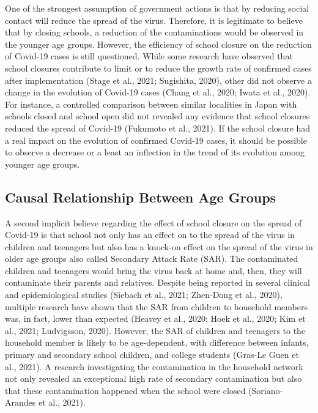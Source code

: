\documentclass[]{elsarticle} %
\begin{document}
One of the strongest assumption of government actions is that by
reducing social contact will reduce the spread of the virus. Therefore,
it is legitimate to believe that by closing schools, a reduction of the
contaminations would be observed in the younger age groups. However, the
efficiency of school closure on the reduction of Covid-19 cases is still
questioned. While some research have observed that school closures
contribute to limit or to reduce the growth rate of confirmed cases
after implementation (Stage et al., 2021; Sugishita, 2020), other did
not observe a change in the evolution of Covid-19 cases (Chang et al.,
2020; Iwata et al., 2020). For instance, a controlled comparison between
similar localities in Japan with schools closed and school open did not
revealed any evidence that school closures reduced the spread of
Covid-19 (Fukumoto et al., 2021). If the school closure had a real
impact on the evolution of confirmed Covid-19 cases, it should be
possible to observe a decrease or a least an inflection in the trend of
its evolution among younger age groups.

\hypertarget{causal-relationship-between-age-groups}{%
\subsection{Causal Relationship Between Age
Groups}\label{causal-relationship-between-age-groups}}

A second implicit believe regarding the effect of school closure on the
spread of Covid-19 is that school not only has an effect on to the
spread of the virus in children and teenagers but also has a knock-on
effect on the spread of the virus in older age groups also called
Secondary Attack Rate (SAR). The contaminated children and teenagers
would bring the virus back at home and, then, they will contaminate
their parents and relatives. Despite being reported in several clinical
and epidemiological studies (Siebach et al., 2021; Zhen-Dong et al.,
2020), multiple research have shown that the SAR from children to
household members was, in fact, lower than expected (Heavey et al.,
2020; Hoek et al., 2020; Kim et al., 2021; Ludvigsson, 2020). However,
the SAR of children and teenagers to the household member is likely to
be age-dependent, with difference between infants, primary and secondary
school children, and college students (Gras-Le Guen et al., 2021). A
research investigating the contamination in the household network not
only revealed an exceptional high rate of secondary contamination but
also that these contamination happened when the school were closed
(Soriano-Arandes et al., 2021).
\end{document}
